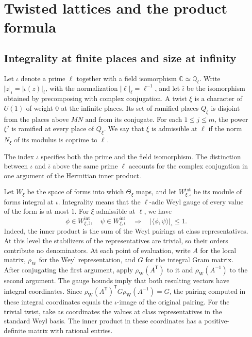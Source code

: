 \section{Twisted lattices and the product formula}\label{sec:lattices}

\subsection{Integrality at finite places and size at infinity}

Let \(\iota\) denote a prime \(\ell\) together with a field isomorphism
\(\mathbb C\simeq\overline{\mathbb Q_\ell}\). Write
\(|z|_\iota=|\iota(z)|_\ell\), with the normalization \(|\ell|_\ell=\ell^{-1}\),
and let \(\bar\iota\) be the isomorphism obtained by precomposing with complex conjugation.
A twist \(\xi\) is a character of \(U(1)\) of weight \(0\) at the infinite places.
Its set of ramified places \(Q_\xi\) is disjoint from the places above \(MN\)
and from its conjugate. For each \(1\le j\le m\), the power \(\xi^j\) is ramified
at every place of \(Q_\xi\). We say that \(\xi\) is admissible at \(\ell\) if the
norm \(N_\xi\) of its modulus is coprime to \(\ell\).

\begin{editorialnote}
The index \(\iota\) specifies both the prime and the field isomorphism.
The distinction between \(\iota\) and \(\bar\iota\) above the same prime \(\ell\)
accounts for the complex conjugation in one argument of the Hermitian inner product.
\end{editorialnote}

Let \(W_\xi\) be the space of forms into which \(\Theta_\xi\) maps, and let
\(W^{\mathrm{int}}_{\xi,\iota}\) be its module of forms integral at \(\iota\).
Integrality means that the \(\ell\)-adic Weyl gauge of every value of the form
is at most \(1\). For \(\xi\) admissible at \(\ell\), we have
\[
  \phi\in W^{\mathrm{int}}_{\xi,\bar\iota},\quad
  \psi\in W^{\mathrm{int}}_{\xi,\iota}
  \quad\Longrightarrow\quad
  |\langle\phi,\psi\rangle|_\iota\le1 .
\]
Indeed, the inner product is the sum of the Weyl pairings at class
representatives. At this level the stabilizers of the representatives are
trivial, so their orders contribute no denominators. At each point of
evaluation, write \(A\) for the local matrix, \(\rho_{\mathrm W}\) for the
Weyl representation, and \(G\) for the integral Gram matrix. After conjugating
the first argument, apply \(\rho_{\mathrm W}(A^{\mathsf T})\) to it and
\(\rho_{\mathrm W}(A^{-1})\) to the second argument. The gauge bounds imply that
both resulting vectors have integral coordinates. Since
\(\rho_{\mathrm W}(A^{\mathsf T})^{\mathsf T}G\rho_{\mathrm W}(A^{-1})=G\),
the pairing computed in these integral coordinates equals the
\(\iota\)-image of the original pairing.
For the trivial twist, take as coordinates the values at class
representatives in the standard Weyl basis. The inner product in these
coordinates has a positive-definite matrix with rational entries.

